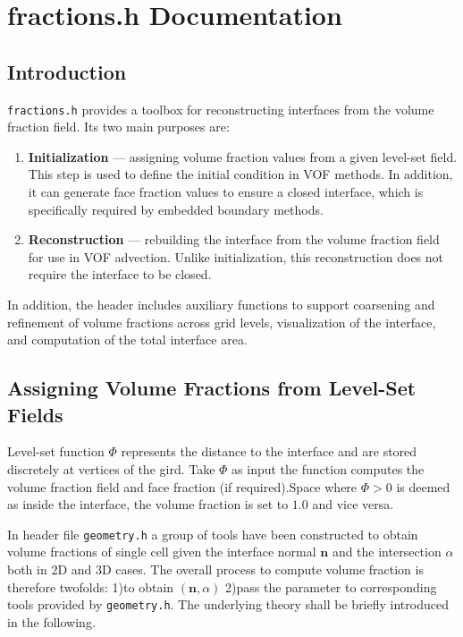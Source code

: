 \chapter{fractions.h Documentation}
\chaptermeta[draft][2025-09-10]
\section{Introduction}\label{sec:intro}
\texttt{fractions.h} provides a toolbox for reconstructing interfaces from the
volume fraction field. Its two main purposes are:

\begin{enumerate}
  \item \textbf{Initialization} --- assigning volume fraction values from a given
  level-set field. This step is used to define the initial condition in VOF
  methods. In addition, it can generate face fraction values to ensure a closed
  interface, which is specifically required by embedded boundary methods.
  \item \textbf{Reconstruction} --- rebuilding the interface from the volume
  fraction field for use in VOF advection. Unlike initialization, this
  reconstruction does not require the interface to be closed.
\end{enumerate}

In addition, the header includes auxiliary functions to support coarsening and refinement of volume fractions across grid levels, visualization of the interface, and computation of the total interface area.

\section{Assigning Volume Fractions from Level-Set Fields}\label{sec:fractions-init}  

Level-set function $\Phi$ represents the distance to the interface and are stored discretely at vertices of the gird. Take $\Phi$ as input the function  computes the volume fraction field and face fraction (if required).Space where $\Phi>0$ is deemed as inside the interface, the volume fraction is set to $1.0$ and vice versa.

In header file \texttt{geometry.h} a group of tools have been constructed to obtain volume fractions of single cell given the interface normal $\mathbf{n}$ and the intersection $\alpha$ both in 2D and 3D cases. The overall process to compute volume fraction is therefore twofolds: 1)to obtain $(\mathbf{n}, \alpha)$ 2)pass the parameter to corresponding tools provided by \texttt{geometry.h}. The underlying theory shall be briefly introduced in the following.

